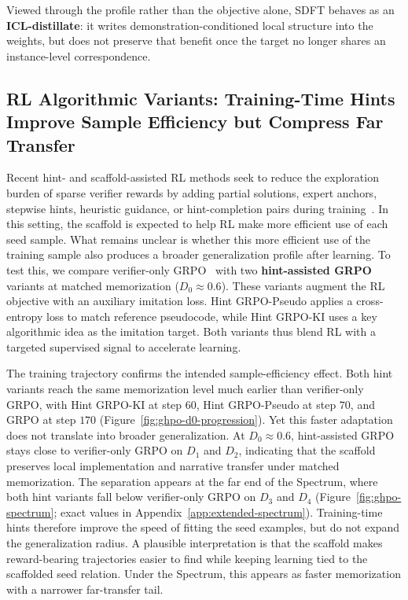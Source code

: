 \documentclass[]{bytedance_seed}
\theoremstyle{plain}
\theoremstyle{definition}
\theoremstyle{remark}
\begin{document}
Viewed through the profile rather than the objective alone, SDFT behaves as an \textbf{ICL-distillate}: it writes demonstration-conditioned local structure into the weights, but does not preserve that benefit once the target no longer shares an instance-level correspondence.


\subsection{RL Algorithmic Variants: Training-Time Hints Improve Sample Efficiency but Compress Far Transfer}
\label{subsec:rl-variants}

Recent hint- and scaffold-assisted RL methods seek to reduce the exploration burden of sparse verifier rewards by adding partial solutions, expert anchors, stepwise hints, heuristic guidance, or hint-completion pairs during training~\citep{li2026questa,ghpo2025,zhang2026bread,zhang2025stephint,wang2026hint,huang2025hintgrpo,kang2025table}. In this setting, the scaffold is expected to help RL make more efficient use of each seed sample. What remains unclear is whether this more efficient use of the training sample also produces a broader generalization profile after learning. To test this, we compare verifier-only GRPO~\citep{shao2024grpo} with two \textbf{hint-assisted GRPO} variants at matched memorization ($D_0 \approx 0.6$). These variants augment the RL objective with an auxiliary imitation loss. Hint GRPO-Pseudo applies a cross-entropy loss to match reference pseudocode, while Hint GRPO-KI uses a key algorithmic idea as the imitation target. Both variants thus blend RL with a targeted supervised signal to accelerate learning.

The training trajectory confirms the intended sample-efficiency effect. Both hint variants reach the same memorization level much earlier than verifier-only GRPO, with Hint GRPO-KI at step $60$, Hint GRPO-Pseudo at step $70$, and GRPO at step $170$ (Figure~\ref{fig:ghpo-d0-progression}). Yet this faster adaptation does not translate into broader generalization. At $D_0 \approx 0.6$, hint-assisted GRPO stays close to verifier-only GRPO on $D_1$ and $D_2$, indicating that the scaffold preserves local implementation and narrative transfer under matched memorization. The separation appears at the far end of the Spectrum, where both hint variants fall below verifier-only GRPO on $D_3$ and $D_4$ (Figure~\ref{fig:ghpo-spectrum}; exact values in Appendix~\ref{app:extended-spectrum}). Training-time hints therefore improve the speed of fitting the seed examples, but do not expand the generalization radius. A plausible interpretation is that the scaffold makes reward-bearing trajectories easier to find while keeping learning tied to the scaffolded seed relation. Under the Spectrum, this appears as faster memorization with a narrower far-transfer tail.
\end{document}
